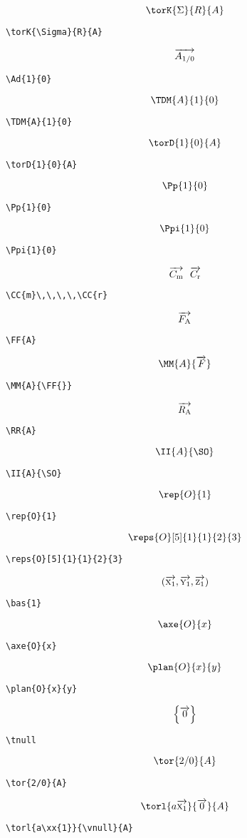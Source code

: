 \documentclass[a4paper,9pt]{article}
\begin{document}
$$\torK{\Sigma}{R}{A}$$
\begin{verbatim}
\torK{\Sigma}{R}{A}
\end{verbatim}
$$\overrightarrow{A_{{1}/{0}}}$$
\begin{verbatim}
\Ad{1}{0}
\end{verbatim}
$$\TDM{A}{1}{0}$$
\begin{verbatim}
\TDM{A}{1}{0}
\end{verbatim}
$$\torD{1}{0}{A}$$
\begin{verbatim}
\torD{1}{0}{A}
\end{verbatim}
$$\Pp{1}{0}$$
\begin{verbatim}
\Pp{1}{0}
\end{verbatim}
$$\Ppi{1}{0}$$
\begin{verbatim}
\Ppi{1}{0}
\end{verbatim}
$$\overrightarrow{C_{\mathrm{m}}}\,\,\,\,\overrightarrow{C_{\mathrm{r}}}$$
\begin{verbatim}
\CC{m}\,\,\,\,\CC{r}
\end{verbatim}
$$\overrightarrow{F_{\mathrm{A}}}$$
\begin{verbatim}
\FF{A}
\end{verbatim}
$$\MM{A}{\FF{}}$$
\begin{verbatim}
\MM{A}{\FF{}}
\end{verbatim}
$$\overrightarrow{R_{\mathrm{A}}}$$
\begin{verbatim}
\RR{A}
\end{verbatim}
$$\II{A}{\SO}$$
\begin{verbatim}
\II{A}{\SO}
\end{verbatim}
$$\rep{O}{1}$$
\begin{verbatim}
\rep{O}{1}
\end{verbatim}
$$\reps{O}[5]{1}{1}{2}{3}$$
\begin{verbatim}
\reps{O}[5]{1}{1}{2}{3}
\end{verbatim}
$$(\overrightarrow{\textsc{x}_{1}},\overrightarrow{\textsc{y}_{1}},\overrightarrow{\textsc{z}_{1}})$$
\begin{verbatim}
\bas{1}
\end{verbatim}
$$\axe{O}{x}$$
\begin{verbatim}
\axe{O}{x}
\end{verbatim}
$$\plan{O}{x}{y}$$
\begin{verbatim}
\plan{O}{x}{y}
\end{verbatim}
$$\Big\{\overrightarrow{0}\Big\}$$
\begin{verbatim}
\tnull
\end{verbatim}
$$\tor{2/0}{A}$$
\begin{verbatim}
\tor{2/0}{A}
\end{verbatim}
$$\torl{a\xx{1}}{\vnull}{A}$$
\begin{verbatim}
\torl{a\xx{1}}{\vnull}{A}
\end{verbatim}
\end{document}
